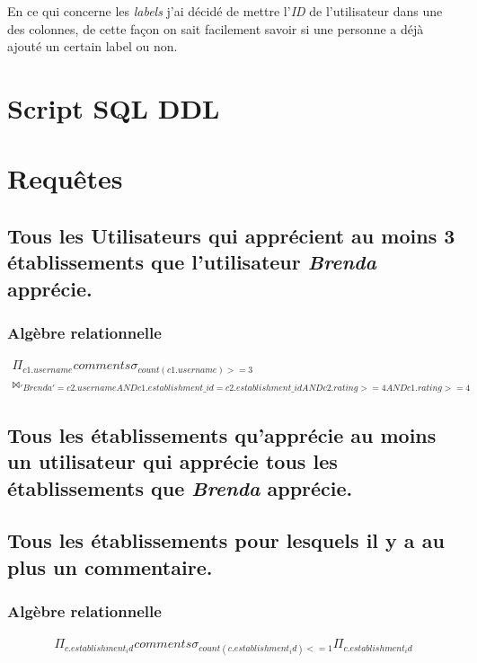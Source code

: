 \documentclass[a4paper,10pt]{article}
\begin{document}
En ce qui concerne les \emph{labels} j'ai décidé de mettre l'\emph{ID} de
l'utilisateur dans une des colonnes, de cette façon on sait facilement savoir
si une personne a déjà ajouté un certain label ou non.

\section{Script SQL DDL}
    

    \pagebreak

\section{Requêtes}
\subsection{Tous les Utilisateurs qui apprécient au moins 3 établissements que
l'utilisateur \emph{Brenda} apprécie.}
    
\subsubsection{Algèbre relationnelle}
\begin{align}
    \Pi_{c1.username}comments \sigma_{count(c1.username)>=3}
    \\\bowtie_{'Brenda'=c2.username AND
    c1.establishment\_id=c2.establishment\_id AND c2.rating>=4 AND
    c1.rating>=4}
\end{align}

\subsection{Tous les établissements qu'apprécie au moins un utilisateur qui
apprécie tous les établissements que \emph{Brenda} apprécie.}
    

\subsection{Tous les établissements pour lesquels il y a au plus un
commentaire.}
    

\subsubsection{Algèbre relationnelle}
    \begin{align}
        \Pi_{c.establishment_id}comments \sigma_{count(c.establishment_id)<=1}\Pi_{c.establishment_id}
    \end{align}
\end{document}
